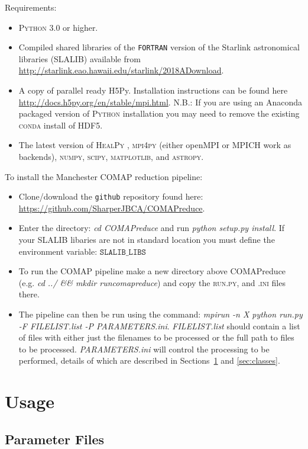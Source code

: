 \documentclass[11pt]{article}
\begin{document}
Requirements:
\begin{itemize}
\item \textsc{Python} 3.0 or higher.
\item Compiled shared libraries of the \texttt{FORTRAN} version of the Starlink astronomical libraries (SLALIB) available from \url{http://starlink.eao.hawaii.edu/starlink/2018ADownload}.
\item A copy of parallel ready H5Py. Installation instructions can be found here \url{http://docs.h5py.org/en/stable/mpi.html}. N.B.: If you are using an Anaconda packaged version of \textsc{Python} installation you may need to remove the existing \textsc{conda} install of HDF5.
\item The latest version of \textsc{HealPy} , \textsc{mpi4py} (either openMPI or MPICH work as backends), \textsc{numpy}, \textsc{scipy}, \textsc{matplotlib}, and \textsc{astropy}.
\end{itemize}

To install the Manchester COMAP reduction pipeline:
\begin{itemize}
  \item Clone/download the \texttt{github} repository found here: \url{https://github.com/SharperJBCA/COMAPreduce}.
  \item Enter the directory: \textit{cd COMAPreduce} and run \textit{python setup.py install}. If your SLALIB libaries are not in standard location you must define the environment variable: $\texttt{SLALIB\_LIBS}$
  \item To run the COMAP pipeline make a new directory above COMAPreduce (e.g. \textit{cd ../ \&\& mkdir runcomapreduce}) and copy the \textsc{run.py}, and \textsc{\*.ini} files there.
  \item The pipeline can then be run using the command: \textit{mpirun -n X python run.py -F FILELIST.list -P PARAMETERS.ini}. \textit{FILELIST.list} should contain a list of files with either just the filenames to be processed or the full path to files to be processed. \textit{PARAMETERS.ini} will control the processing to be performed, details of which are described in Sections~\ref{sec:usage} and \ref{sec:classes}.
\end{itemize}

\section{Usage}\label{sec:usage}

\subsection{Parameter Files}
\end{document}
